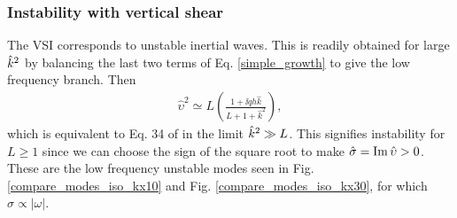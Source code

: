 \subsubsection{Instability with vertical shear}
The VSI corresponds to unstable inertial waves. This
is readily obtained for large $\hat{k}^2$ by balancing
the last two terms of Eq. \ref{simple_growth} to give the low
frequency branch. Then 
\begin{align}
  \hat{\upsilon}^2 \simeq L\left(\frac{1+\ii q h
       \hat{k}}{L+1+\hat{k}^2}\right), \label{simple_growth2}
\end{align}
which is equivalent to Eq. 34 of  in the limit
$\hat{k}^2\gg L$. This signifies instability for
$L\geq1$ since we can choose the sign 
of the square root to make $\hat{\sigma} = \operatorname{Im}\hat{\upsilon}>0$.  These
are the low frequency unstable modes seen in
Fig. \ref{compare_modes_iso_kx10} and
Fig. \ref{compare_modes_iso_kx30}, for which $\sigma\propto|\omega|$.  












